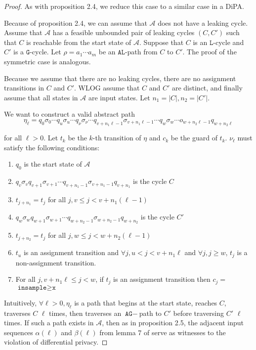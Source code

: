 \documentclass[12pt]{article}
\newcommand{\gguard}{\texttt{insample}\geq \texttt{x}}
\theoremstyle{definition}
\begin{document}
\begin{proof}
	As with proposition 2.4, we reduce this case to a similar case in a DiPA.

	Because of proposition 2.4, we can assume that $\mathcal{A}$ does not have a leaking cycle. Assume that $\mathcal{A}$ has a feasible unbounded pair of leaking cycles $(C, C')$ such that $C$ is reachable from the start state of $\mathcal{A}$. Suppose that $C$ is an $\texttt{L}$-cycle and $C'$ is a $\texttt{G}$-cycle. Let $\rho = a_1\cdots a_m$ be an $\texttt{AL}$-path from $C$ to $C'$. The proof of the symmetric case is analogous.

	Because we assume that there are no leaking cycles, there are no assignment transitions in $C$ and $C'$. WLOG assume that $C$ and $C'$ are distinct, and finally assume that all states in $\mathcal{A}$ are input states. Let $n_1 = |C|, n_2 = |C'|$. 

	We want to construct a valid abstract path \[
		\eta_\ell = q_0\sigma_0\cdots q_u\sigma_u\cdots q_\nu\sigma_\nu\cdots q_{v+n_1\ell-1}\sigma_{v+n_1\ell-1}\cdots q_w\sigma_w\cdots o_{w+n_2\ell-1}q_{w+n_2\ell}	
	\]

	for all $\ell > 0$. Let $t_k$ be the $k$-th transition of $\eta$ and $c_k$ be the guard of $t_k$. $\nu_\ell$ must satisfy the following conditions:
	\begin{enumerate}
		\item $q_0$ is the start state of $\mathcal{A}$
		\item $q_v\sigma_v q_{v+1}\sigma_{v+1}\cdots q_{v+n_1-1}\sigma_{v+n_1-1}q_{v+n_1}$ is the cycle $C$
		\item $t_{j+n_1} = t_j$ for all $j, v\leq j < v+n_1(\ell-1)$
		\item $q_w\sigma_w q_{w+1}\sigma_{w+1}\cdots q_{w+n_2-1}\sigma_{w+n_2-1}q_{w+n_2}$ is the cycle $C'$
		\item $t_{j+n_2} = t_j$ for all $j, w\leq j < w+n_2(\ell-1)$
		\item $t_u$ is an assignment transition and $\forall j, u<j < v+n_1\ell$ and $\forall j,j\geq w$, $t_j$ is a non-assignment transition.
		\item For all $j, v+n_1\ell\leq j <w$, if $t_j$ is an assignment transition then $c_j =$\\$\gguard$ 
	\end{enumerate}

	Intuitively, $\forall\ell>0,\eta_\ell$ is a path that begins at the start state, reaches $C$, traverses $C$ $\ell$ times, then traverses an $\texttt{AG}-$path to $C'$ before traversing $C'$ $\ell$ times. If such a path exists in $\mathcal{A}$, then as in proposition 2.5, the adjacent input sequences $\alpha(\ell)$ and $\beta(\ell)$ from lemma 7 of \cite{chadhaLinearTimeDecidability2021} serve as witnesses to the violation of differential privacy.



\end{proof}
\end{document}
